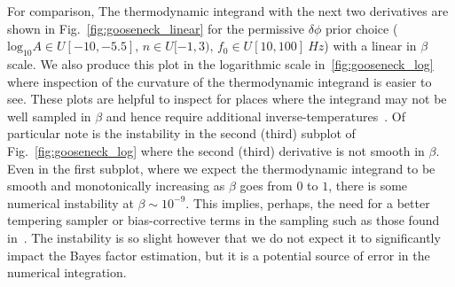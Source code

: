 For comparison, The thermodynamic integrand with the next two derivatives are shown in Fig.~\ref{fig:gooseneck_linear} for the permissive $\delta \phi$ prior choice ($\mathrm{log}_{10} A \in U[-10, -5.5], \, n \in U[-1, 3), \, f_0 \in U[10, 100]~Hz$) with a linear in $\beta$ scale. We also produce this plot in the logarithmic scale in~\ref{fig:gooseneck_log} where inspection of the curvature of the thermodynamic integrand is easier to see. These plots are helpful to inspect for places where the integrand may not be well sampled in $\beta$ and hence require additional inverse-temperatures~\cite{liu2016evaluating, de2011free, de2013comparison}. Of particular note is the instability in the second (third) subplot of Fig.~\ref{fig:gooseneck_log} where the second (third) derivative is not smooth in $\beta$. Even in the first subplot, where we expect the thermodynamic integrand to be smooth and monotonically increasing as $\beta$ goes from $0$ to $1$, there is some numerical instability at $\beta \sim 10^{-9}$. This implies, perhaps, the need for a better tempering sampler or bias-corrective terms in the sampling such as those found in~\cite{oates2017control,evans2019thermodynamic}. The instability is so slight however that we do not expect it to significantly impact the Bayes factor estimation, but it is a potential source of error in the numerical integration.

